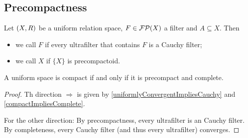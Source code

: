 \subsection{Precompactness}
\begin{definition}
Let $\left( X,R \right)$ be a uniform relation space, $F\in\operatorname{\mathcal{FP}}(X)$ a filter and $A\subseteq X$.
Then 
\begin{itemize}
\item we call $F$  if every ultrafilter that contains $F$ is a Cauchy filter;
\item we call $X$  if $\{X\}$ is precompactoid.
\end{itemize}
\end{definition}

\begin{proposition} \label{compactPrecompactComplete}
A uniform space is compact \textup{if and only if} it is precompact and complete.
\end{proposition}
\begin{proof}
Th direction $\Rightarrow$ is given by \ref{uniformlyConvergentImpliesCauchy} and \ref{compactImpliesComplete}.

For the other direction: By precompactness, every ultrafilter is an Cauchy filter. By completeness, every Cauchy filter (and thus every ultrafilter) converges.
\end{proof}

